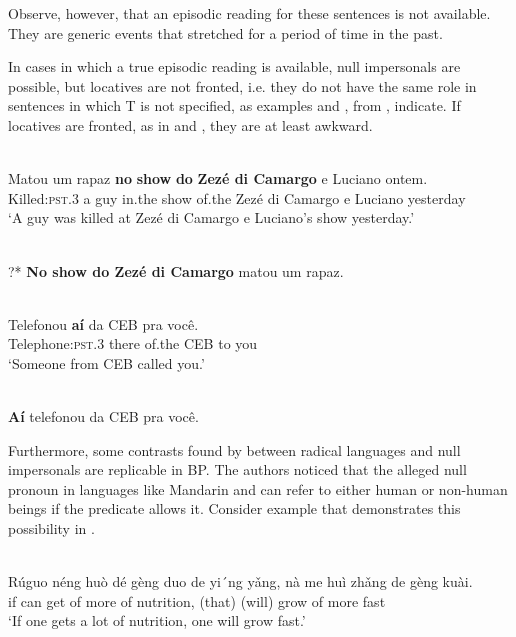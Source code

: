 \documentclass[output=paper]{LSP/langsci}
\begin{document}
Observe, however, that an episodic reading for these sentences is not available. They are generic events that stretched for a period of time in the past.

In cases in which a true episodic reading is available, null impersonals are possible, but locatives are not fronted, i.e. they do not have the same role in sentences in which T is not specified, as examples  and , from \citet{LunguinhoMedeirosJunior2013}, indicate. If locatives are fronted, as in  and , they are at least awkward. 

\ea\label{ex:45.alexiadou}
\\
\gll Matou um rapaz \textbf{no} \textbf{show} \textbf{do} \textbf{Zezé di Camargo} e Luciano ontem.\\
 Killed:\textsc{pst}.3 a guy in.the show of.the {Zezé di Camargo} e Luciano yesterday\\
\glt ‘A guy was killed at Zezé di Camargo e Luciano’s show yesterday.’
\z


\ea\label{ex:46.alexiadou}
\\
{\upshape ?*} \textbf{No show do Zezé di Camargo} matou um rapaz.\\
\z


\ea\label{ex:47.alexiadou}
\\
\gll Telefonou \textbf{aí} da CEB pra você.\\
 Telephone:\textsc{pst}.3 there of.the CEB to you\\
\glt ‘Someone from CEB called you.’
\z 

\ea\label{ex:48.alexiadou}
\\
{\upshape *} \textbf{Aí} telefonou da CEB pra você.\\
\z


 
Furthermore, some contrasts found by \citet{HolmbergEtAl2015} between radical  languages and  null impersonals are replicable in BP. The authors noticed that the alleged null pronoun in languages like Mandarin and  can refer to either human or non-human beings if the predicate allows it. Consider example  that demonstrates this possibility in .


\ea\label{ex:49.alexiadou}
\\
\gll Rúguo néng huò dé {gèng duo} de {yi´ng y\v{a}ng}, {nà me} huì   zh\v{a}ng de gèng kuài.\\
      if   can get  of more      of  nutrition,         (that) (will) grow      of more fast\\
\glt ‘If one gets a lot of nutrition, one will grow fast.’
\z 
\end{document}
